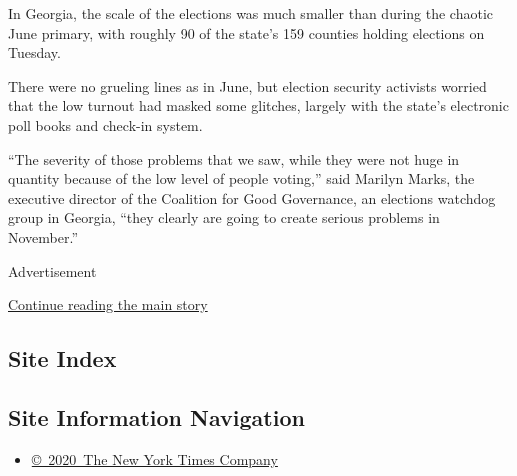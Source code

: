 In Georgia, the scale of the elections was much smaller than during the
chaotic June primary, with roughly 90 of the state's 159 counties
holding elections on Tuesday.

There were no grueling lines as in June, but election security activists
worried that the low turnout had masked some glitches, largely with the
state's electronic poll books and check-in system.

``The severity of those problems that we saw, while they were not huge
in quantity because of the low level of people voting,'' said Marilyn
Marks, the executive director of the Coalition for Good Governance, an
elections watchdog group in Georgia, ``they clearly are going to create
serious problems in November.''

Advertisement

\protect\hyperlink{after-bottom}{Continue reading the main story}

\hypertarget{site-index}{%
\subsection{Site Index}\label{site-index}}

\hypertarget{site-information-navigation}{%
\subsection{Site Information
Navigation}\label{site-information-navigation}}

\begin{itemize}
\tightlist
\item
  \href{https://help.nytimes3xbfgragh.onion/hc/en-us/articles/115014792127-Copyright-notice}{©~2020~The
  New York Times Company}
\end{itemize}

